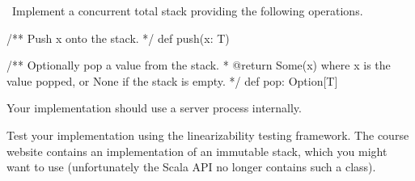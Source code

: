 \begin{question}
\Programming\ Implement a concurrent total stack providing the following
operations. 
% 
\begin{scala}
  /** Push x onto the stack. */
  def push(x: T)

  /** Optionally pop a value from the stack.
    * @return Some(x) where x is the value popped, or None if the stack is empty. */
  def pop: Option[T]
\end{scala}
% 
Your implementation should use a server process internally.

Test your implementation using the linearizability testing framework.  The
course website contains an implementation of an immutable stack, which you
might want to use (unfortunately the Scala API no longer contains such a
class).
\end{question}


